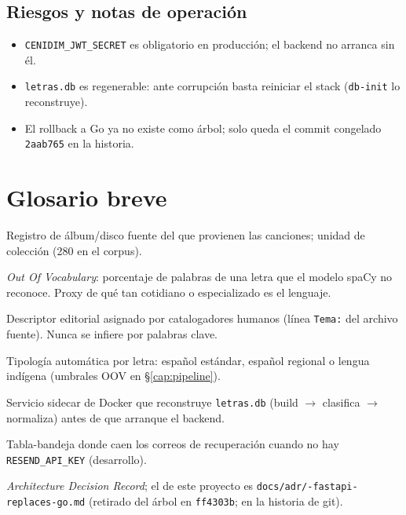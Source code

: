 \documentclass[11pt,letterpaper,twoside]{report}
\newcommand{\codigo}[1]{\texttt{#1}}
\begin{document}
\section{Riesgos y notas de operación}
\begin{itemize}
  \item \codigo{CENIDIM_JWT_SECRET} es obligatorio en producción; el
        backend no arranca sin él.
  \item \codigo{letras.db} es regenerable: ante corrupción basta
        reiniciar el stack (\codigo{db-init} lo reconstruye).
  \item El rollback a Go ya no existe como árbol; solo queda el commit
        congelado \codigo{2aab765} en la historia.
\end{itemize}

\appendix
\chapter{Glosario breve}

\begin{description}[style=nextline]
  \item[Fonograma] Registro de álbum/disco fuente del que provienen las
    canciones; unidad de colección (280 en el corpus).
  \item[OOV] \emph{Out Of Vocabulary}: porcentaje de palabras de una
    letra que el modelo spaCy no reconoce. Proxy de qué tan cotidiano
    o especializado es el lenguaje.
  \item[Tema] Descriptor editorial asignado por catalogadores humanos
    (línea \codigo{Tema:} del archivo fuente). Nunca se infiere por
    palabras clave.
  \item[Clasificación lingüística] Tipología automática por letra:
    español estándar, español regional o lengua indígena (umbrales OOV
    en \S\ref{cap:pipeline}).
  \item[db-init] Servicio sidecar de Docker que reconstruye
    \codigo{letras.db} (build $\to$ clasifica $\to$ normaliza) antes de
    que arranque el backend.
  \item[email\_outbox] Tabla-bandeja donde caen los correos de
    recuperación cuando no hay \codigo{RESEND_API_KEY} (desarrollo).
  \item[ADR] \emph{Architecture Decision Record}; el de este proyecto
    es \codigo{docs/adr/-\allowbreak fastapi-\allowbreak replaces-\allowbreak go.md}
    (retirado del árbol en \codigo{ff4303b}; en la historia de git).
\end{description}
\end{document}
